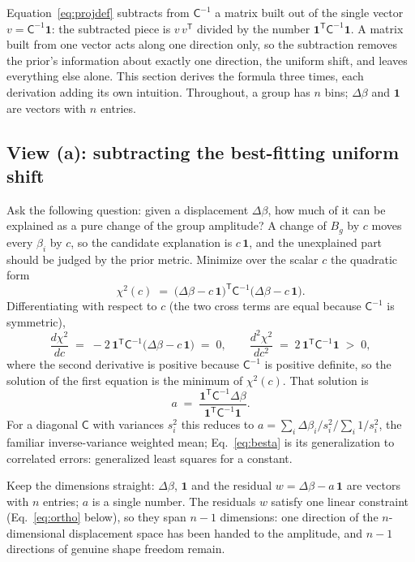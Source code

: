 \documentclass[11pt]{article}
\newcommand{\ones}{\mathbf{1}} %
\newcommand{\Cov}{\mathsf{C}}
\newcommand{\T}{^{\mathsf{T}}}
\begin{document}
Equation~\eqref{eq:projdef} subtracts from $\Cov^{-1}$ a matrix built
out of the single vector $v = \Cov^{-1}\ones$: the subtracted piece is
$v\,v\T$ divided by the number $\ones\T \Cov^{-1} \ones$.  A matrix
built from one vector acts along one direction only, so the subtraction
removes the prior's information about exactly one direction, the
uniform shift, and leaves everything else alone.  This section
derives the formula three times, each derivation adding its own
intuition.  Throughout, a group has $n$ bins; $\Delta\beta$ and $\ones$
are vectors with $n$ entries.

\subsection{View (a): subtracting the best-fitting uniform shift}
\label{sec:viewa}

Ask the following question: given a displacement $\Delta\beta$, how much
of it can be explained as a pure change of the group amplitude?  A
change of $B_g$ by $c$ moves every $\beta_i$ by $c$, so the candidate
explanation is $c\,\ones$, and the unexplained part should be judged by
the prior metric.  Minimize over the scalar $c$ the quadratic form
\begin{equation}
  \chi^2(c)
  \;=\;
  \bigl(\Delta\beta - c\,\ones\bigr)\T
  \Cov^{-1}
  \bigl(\Delta\beta - c\,\ones\bigr).
  \label{eq:chi2c}
\end{equation}
Differentiating with respect to $c$ (the two cross terms are equal
because $\Cov^{-1}$ is symmetric),
\begin{equation}
  \frac{d\chi^2}{dc}
  \;=\;
  -2\,\ones\T \Cov^{-1} \bigl(\Delta\beta - c\,\ones\bigr)
  \;=\; 0,
  \qquad
  \frac{d^2\chi^2}{dc^2}
  \;=\;
  2\,\ones\T \Cov^{-1} \ones \;>\; 0,
  \label{eq:focs}
\end{equation}
where the second derivative is positive because $\Cov^{-1}$ is positive
definite, so the solution of the first equation is the minimum of
$\chi^2(c)$.  That solution is
\begin{equation}
  a \;=\;
  \frac{\ones\T \Cov^{-1} \Delta\beta}{\ones\T \Cov^{-1} \ones} .
  \label{eq:besta}
\end{equation}
For a diagonal $\Cov$ with variances $s_i^2$ this reduces to
$a = \sum_i \Delta\beta_i / s_i^2 \big/ \sum_i 1/s_i^2$, the familiar
inverse-variance weighted mean; Eq.~\eqref{eq:besta} is its
generalization to correlated errors: generalized least squares for a
constant.

Keep the dimensions straight: $\Delta\beta$, $\ones$ and the residual
$w = \Delta\beta - a\,\ones$ are vectors with $n$ entries; $a$ is a
single number.  The residuals $w$ satisfy one linear constraint
(Eq.~\eqref{eq:ortho} below), so they span $n - 1$ dimensions: one
direction of the $n$-dimensional displacement space has been handed to
the amplitude, and $n - 1$ directions of genuine shape freedom remain.
\end{document}
